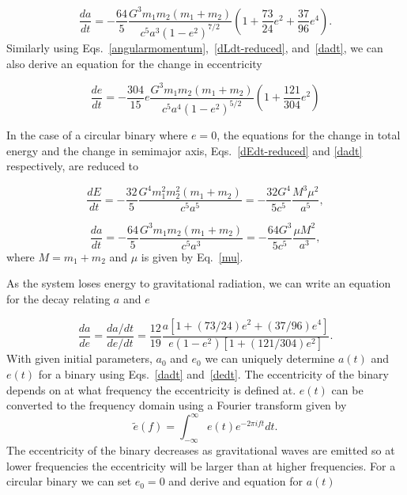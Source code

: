 \begin{equation}\label{dadt}
    \frac{da}{dt} = -\frac{64}{5}\frac{G^3m_1m_2(m_1+m_2)}{c^5a^3(1-e^2)^{7/2}}\left(1+\frac{73}{24}e^2+\frac{37}{96}e^4\right).
\end{equation}
Similarly using Eqs.~\ref{angularmomentum},~\ref{dLdt-reduced}, and~\ref{dadt}, we can also derive an equation for the change in eccentricity

\begin{equation}\label{dedt}
    \frac{de}{dt} = -\frac{304}{15}e\frac{G^3m_1m_2(m_1+m_2)}{c^5a^4(1-e^2)^{5/2}}\left(1+\frac{121}{304}e^2\right)
\end{equation}

In the case of a circular binary where $e = 0$, the equations for the change in total energy and the change in semimajor axis, Eqs.~\ref{dEdt-reduced} and \ref{dadt} respectively, are reduced to

\begin{equation}
    \frac{dE}{dt} = -\frac{32}{5}\frac{G^4m_1^2m_2^2(m_1+m_2)}{c^5a^5} = -\frac{32G^4}{5c^5}\frac{M^3\mu^2}{a^5},
\end{equation}

\begin{equation}
    \frac{da}{dt} = -\frac{64}{5}\frac{G^3m_1m_2(m_1+m_2)}{c^5a^3} = -\frac{64G^3}{5c^5}\frac{\mu M^2}{a^3}, 
\end{equation}
where $M=m_1+m_2$ and $\mu$ is given by Eq.~\ref{mu}. 

As the system loses energy to gravitational radiation, we can write an equation for the decay relating $a$ and $e$

\begin{equation}\label{dade}
     \frac{da}{de} = \frac{da/dt}{de/dt} = \frac{12}{19}\frac{a[1+(73/24)e^2+(37/96)e^4]}{e(1-e^2)[1+(121/304)e^2]}.
\end{equation}
With given initial parameters, $a_0$ and $e_0$ we can uniquely determine $a(t)$ and $e(t)$ for a binary using Eqs.~\ref{dadt} and~\ref{dedt}. The eccentricity of the binary depends on at what frequency the eccentricity is defined at. $e(t)$ can be converted to the frequency domain using a Fourier transform given by
\begin{equation}
    \tilde{e}(f) = \int_{-\infty}^{\infty} e(t)e^{-2\pi ift} dt.
\end{equation}
The eccentricity of the binary decreases as gravitational waves are emitted so at lower frequencies the eccentricity will be larger than at higher frequencies. For a circular binary we can set $e_0 = 0$ and derive and equation for $a(t)$

